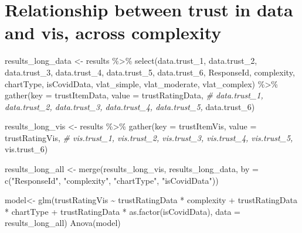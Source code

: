 \documentclass[
]{article}
\newenvironment{Shaded}{\begin{snugshade}}{\end{snugshade}}
\newcommand{\AttributeTok}[1]{\textcolor[rgb]{0.77,0.63,0.00}{#1}}
\newcommand{\CommentTok}[1]{\textcolor[rgb]{0.56,0.35,0.01}{\textit{#1}}}
\newcommand{\FunctionTok}[1]{\textcolor[rgb]{0.00,0.00,0.00}{#1}}
\newcommand{\NormalTok}[1]{#1}
\newcommand{\OtherTok}[1]{\textcolor[rgb]{0.56,0.35,0.01}{#1}}
\newcommand{\SpecialCharTok}[1]{\textcolor[rgb]{0.00,0.00,0.00}{#1}}
\newcommand{\StringTok}[1]{\textcolor[rgb]{0.31,0.60,0.02}{#1}}
\begin{document}
\hypertarget{relationship-between-trust-in-data-and-vis-across-complexity}{%
\section{Relationship between trust in data and vis, across
complexity}\label{relationship-between-trust-in-data-and-vis-across-complexity}}

\begin{Shaded}
\begin{Highlighting}[]
\NormalTok{results\_long\_data }\OtherTok{\textless{}{-}}\NormalTok{ results }\SpecialCharTok{\%\textgreater{}\%}
  \FunctionTok{select}\NormalTok{(data.trust\_1, data.trust\_2, data.trust\_3,}
\NormalTok{         data.trust\_4, data.trust\_5, data.trust\_6,}
\NormalTok{         ResponseId, complexity,}
\NormalTok{         chartType, isCovidData, }
\NormalTok{         vlat\_simple, vlat\_moderate, vlat\_complex) }\SpecialCharTok{\%\textgreater{}\%}
  \FunctionTok{gather}\NormalTok{(}\AttributeTok{key =}\NormalTok{ trustItemData, }\AttributeTok{value =}\NormalTok{ trustRatingData, }
         \CommentTok{\# data.trust\_1, data.trust\_2, data.trust\_3, data.trust\_4, data.trust\_5, }
\NormalTok{         data.trust\_6)}

\NormalTok{results\_long\_vis }\OtherTok{\textless{}{-}}\NormalTok{ results }\SpecialCharTok{\%\textgreater{}\%}
  \FunctionTok{gather}\NormalTok{(}\AttributeTok{key =}\NormalTok{ trustItemVis, }\AttributeTok{value =}\NormalTok{ trustRatingVis, }
         \CommentTok{\# vis.trust\_1, vis.trust\_2, vis.trust\_3, vis.trust\_4, vis.trust\_5, }
\NormalTok{         vis.trust\_6)}

\NormalTok{results\_long\_all }\OtherTok{\textless{}{-}} \FunctionTok{merge}\NormalTok{(results\_long\_vis, results\_long\_data, }
                          \AttributeTok{by =} \FunctionTok{c}\NormalTok{(}\StringTok{"ResponseId"}\NormalTok{, }\StringTok{"complexity"}\NormalTok{, }\StringTok{"chartType"}\NormalTok{, }\StringTok{"isCovidData"}\NormalTok{))}

\NormalTok{model}\OtherTok{\textless{}{-}} \FunctionTok{glm}\NormalTok{(trustRatingVis }\SpecialCharTok{\textasciitilde{}}\NormalTok{  trustRatingData }\SpecialCharTok{*}\NormalTok{ complexity }\SpecialCharTok{+} 
\NormalTok{              trustRatingData }\SpecialCharTok{*}\NormalTok{  chartType }\SpecialCharTok{+} 
\NormalTok{              trustRatingData }\SpecialCharTok{*}  \FunctionTok{as.factor}\NormalTok{(isCovidData),}
                      \AttributeTok{data =}\NormalTok{ results\_long\_all)}
\FunctionTok{Anova}\NormalTok{(model)}
\end{Highlighting}
\end{Shaded}
\end{document}
